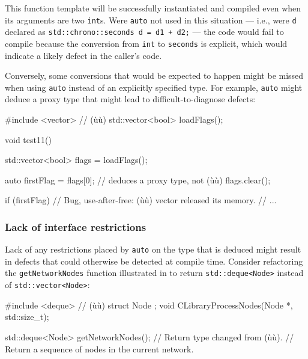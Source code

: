 \noindent This function template will be successfully instantiated and compiled
even when its arguments are two \lstinline!int!s. Were \lstinline!auto! not
used in this situation --- i.e., were \lstinline!d! declared as
\lstinline!std::chrono::seconds!~\lstinline!d!~\lstinline!=!~\lstinline!d1!~\lstinline!+!~\lstinline!d2;!
--- the code would fail to compile because the conversion from
\lstinline!int! to \lstinline!seconds! is explicit, which would indicate a
likely defect in the caller's code.

Conversely, some conversions that would be expected to happen might be
missed when using \lstinline!auto! instead of an explicitly specified type.
For example, \lstinline!auto! might deduce a proxy type that might lead to
difficult-to-diagnose defects:

\begin{emcppshiddenlisting}[emcppsbatch=e17]
#include <vector>     // (ù{}ù)
std::vector<bool> loadFlags();
\end{emcppshiddenlisting}
\begin{emcppslisting}[emcppsbatch=e17]
void test11()
{
    std::vector<bool> flags = loadFlags();

    auto firstFlag = flags[0];  // deduces a proxy type, not (ù{}ù)
    flags.clear();

    if (firstFlag) // Bug, use-after-free: (ù{}ù) vector released its memory.
    {
        // ...
    }
}
\end{emcppslisting}
    

\subsubsection[Lack of interface restrictions]{Lack of interface restrictions}\label{lack-of-interface-restrictions}

Lack of any restrictions placed by \lstinline!auto! on the type that is
deduced might result in defects that could otherwise be detected at
compile time. Consider refactoring the \lstinline!getNetworkNodes! function
illustrated in  to return \lstinline!std::deque<Node>! instead of
\lstinline!std::vector<Node>!:

\begin{emcppshiddenlisting}[emcppsbatch=e18]
#include <deque>     // (ù{}ù)
struct Node {};
void CLibraryProcessNodes(Node *, std::size_t);
\end{emcppshiddenlisting}
\begin{emcppslisting}[emcppsbatch=e18]
std::deque<Node> getNetworkNodes();  // Return type changed from (ù{}ù).
    // Return a sequence of nodes in the current network.
\end{emcppslisting}
    
